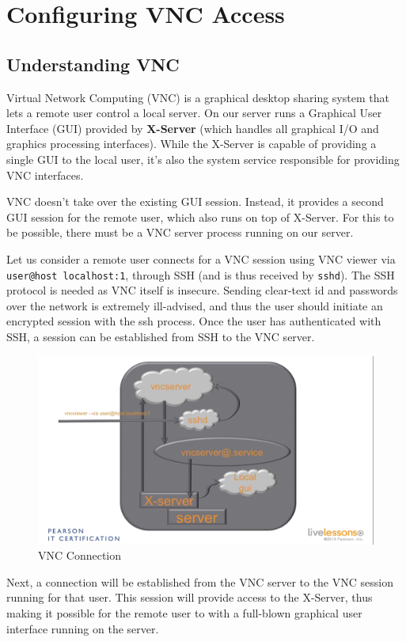 \chapter{Configuring VNC Access}

\section{Understanding VNC}
Virtual Network Computing (VNC) is a graphical desktop sharing system that lets a remote user control a local server. On our server runs a Graphical User Interface (GUI) provided by \textbf{X-Server} (which handles all graphical I/O and graphics processing interfaces). While the X-Server is capable of providing a single GUI to the local user, it's also the system service responsible for providing VNC interfaces. 

VNC doesn't take over the existing GUI session. Instead, it provides a second GUI session for the remote user, which also runs on top of X-Server. For this to be possible, there must be a VNC server process running on our server. 

Let us consider a remote user connects for a VNC session using VNC viewer via \verb|user@host localhost:1|, through SSH (and is thus received by \verb|sshd|). The SSH protocol is needed as VNC itself is insecure. Sending clear-text id and passwords over the network is extremely ill-advised, and thus the user should initiate an encrypted session with the ssh process. Once the user has authenticated with SSH, a session can be established from SSH to the VNC server. 

\begin{figure}[H]
	\centering
	\includegraphics[width=0.9\linewidth]{Mod4/chapters/4.26.a}
	\caption{VNC Connection}
	\label{fig:4 VNC Connection}
\end{figure}


Next, a connection will be established from the VNC server to the VNC session running for that user. This session will provide access to the X-Server, thus making it possible for the remote user to with a full-blown graphical user interface running on the server. 

